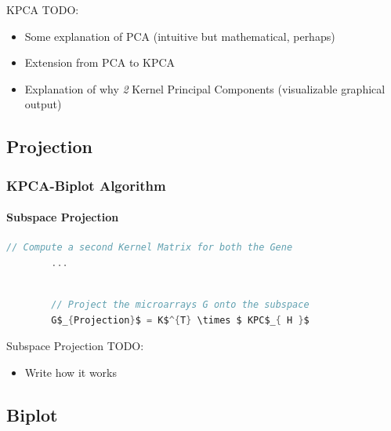 \documentclass[serif]{beamer}
\newcommand{\codepause}{\pause \vspace{-0.165in} }
\begin{document}
	\begin{frame}
		\begin{block}{KPCA TODO:}
			\begin{itemize}
			\item  Some explanation of PCA (intuitive but mathematical, perhaps)
			\item  Extension from PCA to KPCA
			\item  Explanation of why \emph{2} Kernel Principal Components (visualizable graphical output)	
			\end{itemize}
		\end{block}
	\end{frame}

	\subsection{Projection}
	
	\begin{frame}[t, fragile]
		\frametitle{KPCA-Biplot Algorithm}
		\framesubtitle{Subspace Projection}
		
		\begin{lstlisting}[mathescape, language=C]
		// Compute a second Kernel Matrix for both the Gene
		...
		\end{lstlisting}
		\codepause
		\begin{lstlisting}[mathescape, language=C]
		
		// Project the microarrays G onto the subspace
		G$_{Projection}$ = K$^{T} \times $ KPC$_{ H }$
		\end{lstlisting}		
	\end{frame}
	
	\begin{frame}
		\begin{block}{Subspace Projection TODO:}
			\begin{itemize}
				\item  Write how it works
			\end{itemize}
		\end{block}
	\end{frame}
	
	\subsection{Biplot}
\end{document}
